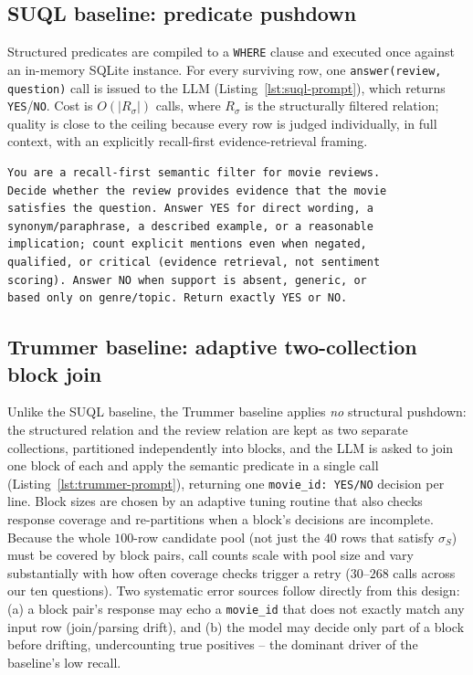 \documentclass[sigconf,natbib=false]{acmart}
\begin{document}
\subsection{SUQL baseline: predicate pushdown}
Structured predicates are compiled to a \texttt{WHERE} clause and executed once against an in-memory SQLite instance. For every surviving row, one \texttt{answer(review, question)} call is issued to the LLM (Listing~\ref{lst:suql-prompt}), which returns \texttt{YES}/\texttt{NO}. Cost is $O(|R_\sigma|)$ calls, where $R_\sigma$ is the structurally filtered relation; quality is close to the ceiling because every row is judged individually, in full context, with an explicitly recall-first evidence-retrieval framing.

\begin{lstlisting}[style=prompt, caption={\texttt{answer()} system prompt, verbatim from the implementation (SUQL baseline).}, label={lst:suql-prompt}]
You are a recall-first semantic filter for movie reviews.
Decide whether the review provides evidence that the movie
satisfies the question. Answer YES for direct wording, a
synonym/paraphrase, a described example, or a reasonable
implication; count explicit mentions even when negated,
qualified, or critical (evidence retrieval, not sentiment
scoring). Answer NO when support is absent, generic, or
based only on genre/topic. Return exactly YES or NO.
\end{lstlisting}

\subsection{Trummer baseline: adaptive two-collection block join}
\label{sec:trummer-baseline}
Unlike the SUQL baseline, the Trummer baseline applies \emph{no} structural pushdown: the structured relation and the review relation are kept as two separate collections, partitioned independently into blocks, and the LLM is asked to join one block of each and apply the semantic predicate in a single call (Listing~\ref{lst:trummer-prompt}), returning one \texttt{movie\_id: YES/NO} decision per line. Block sizes are chosen by an adaptive tuning routine that also checks response coverage and re-partitions when a block's decisions are incomplete. Because the whole $100$-row candidate pool (not just the $40$ rows that satisfy $\sigma_S$) must be covered by block pairs, call counts scale with pool size and vary substantially with how often coverage checks trigger a retry ($30$--$268$ calls across our ten questions). Two systematic error sources follow directly from this design: (a) a block pair's response may echo a \texttt{movie\_id} that does not exactly match any input row (join/parsing drift), and (b) the model may decide only part of a block before drifting, undercounting true positives -- the dominant driver of the baseline's low recall.
\end{document}
